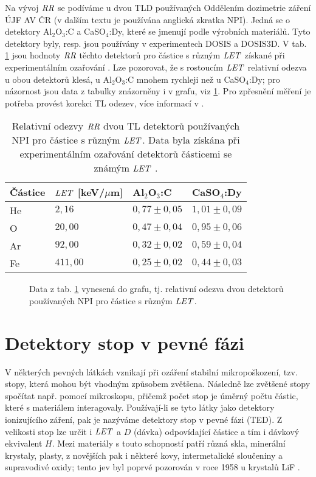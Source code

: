 Na vývoj $\mathit{RR}$ se podíváme u dvou TLD používaných Oddělením dozimetrie záření ÚJF AV ČR (v dalším textu je používána anglická zkratka NPI). Jedná se o detektory Al$_2$O$_3$:C a CaSO$_4$:Dy, které se jmenují podle výrobních materiálů. Tyto detektory byly, resp. jsou používány v experimentech DOSIS a DOSIS3D. V tab. \ref{tab:detektory_TLD_RR} jsou hodnoty $\mathit{RR}$ těchto detektorů pro částice s různým $\mathit{LET}$ získané při experimentálním ozařování \cite{TLD_RR}. Lze pozorovat, že s rostoucím $\mathit{LET}$ relativní odezva u obou detektorů klesá, u Al$_2$O$_3$:C mnohem rychleji než u CaSO$_4$:Dy; pro názornost jsou data z tabulky znázorněny i v grafu, viz \ref{fig:detektory_TLD_RR}. Pro zpřesnění měření je potřeba provést korekci TL odezev, více informací v
\cite{TLD_RR}.
\begin{table}[h]
  \centering
  \begin{tabular}{llll}
	\toprule
	Částice&$\mathit{LET}$ [keV/$\mu$m]&Al$_2$O$_3$:C & CaSO$_4$:Dy\\
	\midrule
	He&$2,16$ &$0,77 \pm0,05$&$1,01\pm 0,09$\\
	O &$20,00$ &$0,47 \pm0,04$&$0,95\pm 0,06$\\
	Ar&$92,00$ &$0,32 \pm0,02$&$0,59\pm 0,04$\\
	Fe&$411,00 $ &$0,25 \pm0,02$&$0,44\pm 0,03$\\
\bottomrule
  \end{tabular}
  \caption{Relativní odezvy $\mathit{RR}$ dvou TL detektorů používaných NPI pro částice s různým $\mathit{LET}$. Data byla získána při experimentálním ozařování detektorů částicemi se známým $\mathit{LET}$ \cite{TLD_RR}.}
  \label{tab:detektory_TLD_RR}
\end{table}
\begin{figure}[h]
  \centering
  
  \caption{Data z tab. \ref{tab:detektory_TLD_RR} vynesená do grafu, tj. relativní odezva dvou detektorů používaných NPI pro částice s různým $\mathit{LET}$.}
  \label{fig:detektory_TLD_RR}
\end{figure}
\section{Detektory stop v pevné fázi}
V některých pevných látkách vznikají při ozáření stabilní mikropoškození, tzv. stopy, která mohou být vhodným způsobem zvětšena. Následně lze zvětšené stopy spočítat např. pomocí mikroskopu, přičemž počet stop je úměrný počtu částic, které s materiálem interagovaly. Používají-li se tyto látky jako detektory ionizujícího záření, pak je nazýváme detektory stop v pevné fázi (TED). Z velikosti stop lze určit i $\mathit{LET}$ a $D$ (dávka) odpovídající částice a tím i dávkový ekvivalent $H$. Mezi materiály s touto schopností patří různá skla, minerální krystaly, plasty, z novějších pak i některé kovy, intermetalické sloučeniny a supravodivé oxidy; tento jev byl poprvé pozorován v roce 1958 u krystalů LiF \cite{objevTED}. 

